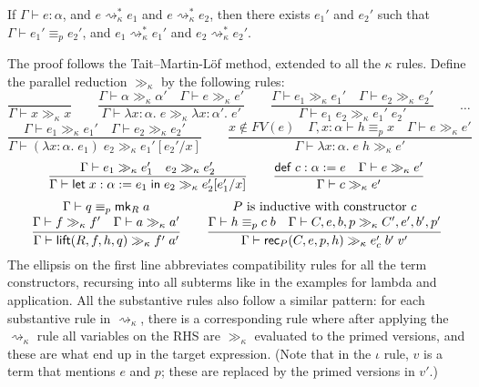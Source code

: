 \begin{theorem}\label{church_rosser}
If $\Gamma\vdash e:\alpha$, and $e\rightsquigarrow_\kappa^* e_1$ and $e\rightsquigarrow_\kappa^* e_2$, then there exists $e_1'$ and $e_2'$ such that $\Gamma\vdash e_1'\equiv_p e_2'$, and $e_1\rightsquigarrow_\kappa^* e_1'$ and $e_2\rightsquigarrow_\kappa^* e_2'$.
\end{theorem}
The proof follows the Tait--Martin-L\"{o}f method, extended to all the $\kappa$ rules. Define the parallel reduction $\gg_\kappa$ by the following rules:
$$\frac{}{\Gamma\vdash x\gg_\kappa x}\qquad
\frac{\Gamma\vdash \alpha\gg_\kappa\alpha'\quad \Gamma\vdash e\gg_\kappa e'}{\Gamma\vdash \lambda x:\alpha.\;e\gg_\kappa \lambda x:\alpha'.\;e'}\qquad
\frac{\Gamma\vdash e_1\gg_\kappa e_1'\quad \Gamma\vdash e_2\gg_\kappa e_2'}{\Gamma\vdash e_1\;e_2\gg_\kappa e_1'\;e_2'}\qquad\dots$$
$$\frac{\Gamma\vdash e_1\gg_\kappa e_1'\quad \Gamma\vdash e_2\gg_\kappa e_2'}{\Gamma\vdash (\lambda x:\alpha.\;e_1)\;e_2\gg_\kappa e_1'[e_2'/x]}\qquad
\frac{x\notin FV(e)\quad \Gamma,x:\alpha\vdash h\equiv_p x\quad \Gamma\vdash e\gg_\kappa e'}{\Gamma\vdash \lambda x:\alpha.\;e\;h\gg_\kappa e'}$$
$$\frac{\Gamma\vdash e_1\gg_\kappa e_1'\quad e_2\gg_\kappa e_2'}{\Gamma\vdash \elet{x:\alpha:=e_1}{e_2}\gg_\kappa e_2'[e_1'/x]}\qquad
\frac{\mathsf{def}\;c:\alpha:=e\quad \Gamma\vdash e\gg_\kappa e'}{\Gamma\vdash c\gg_\kappa e'}$$
$$\frac{\begin{matrix}
\Gamma\vdash q\equiv_p \mk_R\;a\\
\Gamma\vdash f\gg_\kappa f'\quad \Gamma\vdash a\gg_\kappa a'
\end{matrix}}{\Gamma\vdash \lift(R,f,h,q)\gg_\kappa f'\;a'}\qquad
\frac{\begin{matrix}
P\mbox{ is inductive with constructor }c\\
\Gamma\vdash h\equiv_p c\;b\quad \Gamma\vdash C,e,b,p\gg_\kappa C',e',b',p'
\end{matrix}}{\Gamma\vdash \rec_P(C,e,p,h)\gg_\kappa e_c'\;b'\;v'}$$
The ellipsis on the first line abbreviates compatibility rules for all the term constructors, recursing into all subterms like in the examples for lambda and application. All the substantive rules also follow a similar pattern: for each substantive rule in $\rightsquigarrow_\kappa$, there is a corresponding rule where after applying the $\rightsquigarrow_\kappa$ rule all variables on the RHS are $\gg_\kappa$ evaluated to the primed versions, and these are what end up in the target expression. (Note that in the $\iota$ rule, $v$ is a term that mentions $e$ and $p$; these are replaced by the primed versions in $v'$.)

